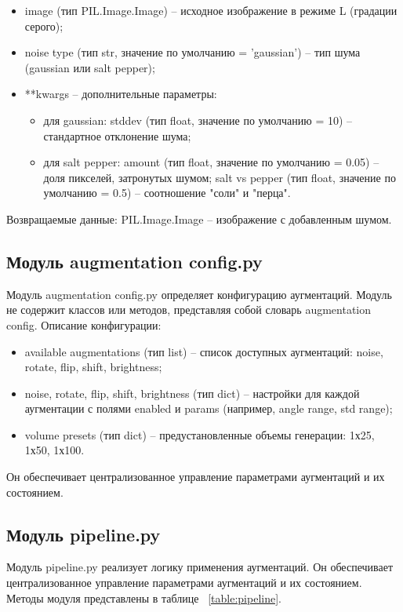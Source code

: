 \begin{itemize}
	\item image (тип PIL.Image.Image) – исходное изображение в режиме L (градации серого);
	\item noise type (тип str, значение по умолчанию = 'gaussian') – тип шума (gaussian или salt pepper);
	\item **kwargs – дополнительные параметры:
	\begin{itemize}
		\item для gaussian: stddev (тип float, значение по умолчанию = 10) – стандартное отклонение шума;
		\item для salt pepper: amount (тип float, значение по умолчанию = 0.05) – доля пикселей, затронутых шумом; salt vs pepper (тип float, значение по умолчанию = 0.5) – соотношение "соли" и "перца".
	\end{itemize}
\end{itemize}

Возвращаемые данные: PIL.Image.Image – изображение с добавленным шумом.

\subsection{Модуль augmentation config.py}

Модуль augmentation config.py определяет конфигурацию аугментаций. Модуль не содержит классов или методов, представляя собой словарь augmentation config. Описание конфигурации:

\begin{itemize}
	\item available augmentations (тип list) – список доступных аугментаций: noise, rotate, flip, shift, brightness;
	\item noise, rotate, flip, shift, brightness (тип dict) – настройки для каждой аугментации с полями enabled и params (например, angle range, std range);
	\item volume presets (тип dict) – предустановленные объемы генерации: 1х25, 1х50, 1х100.
\end{itemize}

Он обеспечивает централизованное управление параметрами аугментаций и их состоянием.

\subsection{Модуль pipeline.py}

Модуль pipeline.py реализует логику применения аугментаций. Он обеспечивает централизованное управление параметрами аугментаций и их состоянием. Методы модуля представлены в таблице ~\ref{table:pipeline}.


